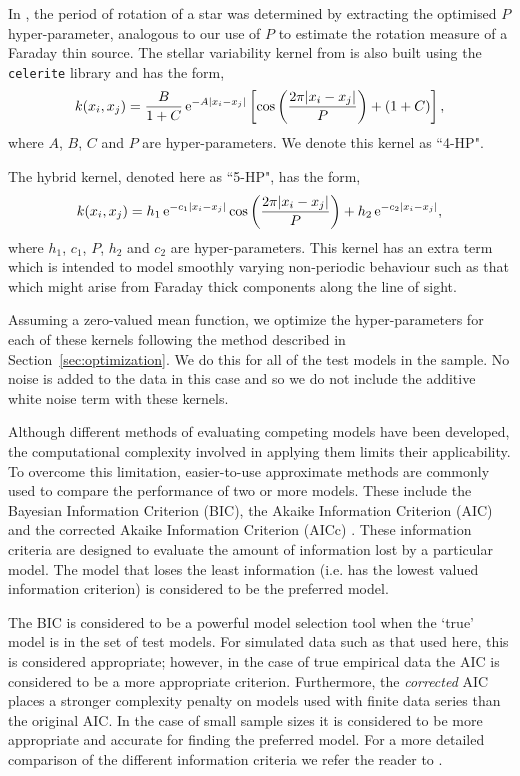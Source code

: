 \documentclass[fleqn,usenatbib]{mnras}
\begin{document}
In \cite{celerite}, the period of rotation of a star was determined by extracting the optimised $P$ hyper-parameter, analogous to our use of $P$ to estimate the rotation measure of a Faraday thin source. The stellar variability kernel from \cite{celerite} is also built using the {\tt celerite} library and has the form,
%
\begin{equation}
\label{eq:4hpkernel}
k(x_i,x_j)=\frac{B}{1+C}\,{\rm e}^{-A|x_i - x_j|}\left[\cos\left(\frac{2\pi|x_i - x_j|}{P}\right) + (1+C)\right],
\end{equation}
%
where $A$, $B$, $C$ and $P$ are hyper-parameters. We denote this kernel as ``4-HP".

The hybrid kernel, denoted here as ``5-HP", has the form,
%
\begin{equation}
\label{eq:5hpkernel}
k(x_i,x_j)=h_1\,{\rm e}^{-c_1|x_i - x_j|}\cos\left(\frac{2\pi|x_i - x_j|}{P}\right) + h_2\,{\rm e}^{-c_2|x_i - x_j|},
\end{equation}
%
where $h_1$, $c_1$, $P$, $h_2$ and $c_2$ are hyper-parameters. This kernel has an extra term which is intended to model smoothly varying non-periodic behaviour such as that which might arise from Faraday thick components along the line of sight.

Assuming a zero-valued mean function, we optimize the hyper-parameters for each of these kernels following the method described in Section~\ref{sec:optimization}. We do this for all of the test models in the \cite{Sun_2015} sample. No noise is added to the data in this case and so we do not include the additive white noise term with these kernels.

Although different methods of evaluating competing models have been developed, the computational complexity involved in applying them limits their applicability. To overcome this limitation, easier-to-use approximate methods are commonly used to compare the performance of two or more models. These include the Bayesian Information Criterion (BIC), the Akaike Information Criterion (AIC) and the corrected Akaike Information Criterion (AICc) \citep{doi:10.1177/0049124104268644}. These information criteria are designed to evaluate the amount of information lost by a particular model. The model that loses the least information (i.e. has the lowest valued information criterion) is considered to be the preferred model.

The BIC is considered to be a powerful model selection tool when the `true' model is in the set of test models. For simulated data such as that used here, this is considered appropriate; however, in the case of true empirical data the AIC is considered to be a more appropriate criterion. Furthermore, the {\it corrected} AIC places a stronger complexity penalty on models used with finite data series than the original AIC. In the case of small sample sizes it is considered to be more appropriate and accurate for finding the preferred model. For a more detailed comparison of the different information criteria we refer the reader to \cite{doi:10.1177/0049124104268644}.
\end{document}
